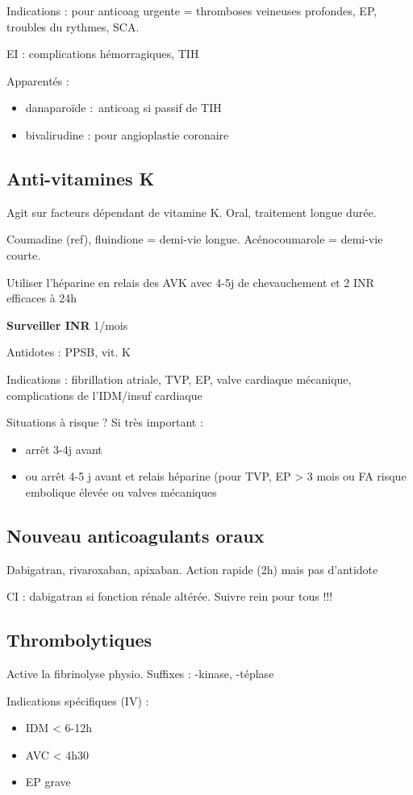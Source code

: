 \documentclass{article}
\begin{document}
Indications : pour anticoag urgente = thromboses veineuses profondes, EP,
troubles du rythmes, SCA.

EI : complications hémorragiques, TIH

Apparentés :
\begin{itemize}
  \item danaparoïde : anticoag si passif de TIH
  \item bivalirudine : pour angioplastie coronaire
\end{itemize}

\subsection{Anti-vitamines K}
Agit sur facteurs dépendant de vitamine K. Oral, traitement longue durée.

Coumadine (ref), fluindione = demi-vie longue. Acénocoumarole = demi-vie courte.

Utiliser l'héparine en relais des AVK avec 4-5j de chevauchement et 2 INR
efficaces à 24h

\textbf{Surveiller INR}  1/mois \danger

Antidotes : PPSB, vit. K

Indications : fibrillation atriale, TVP, EP, valve cardiaque mécanique,
complications de l'IDM/insuf cardiaque

Situations à risque ? Si très important :
\begin{itemize}
  \item arrêt 3-4j avant
  \item ou arrêt 4-5 j avant et relais héparine (pour TVP, EP > 3 mois ou FA
    risque embolique élevée ou valves mécaniques
\end{itemize}

\subsection{Nouveau anticoagulants oraux}
Dabigatran, rivaroxaban, apixaban. Action rapide (2h) mais pas d'antidote

CI : dabigatran si fonction rénale altérée. Suivre rein pour tous !!!

\subsection{Thrombolytiques}
Active la fibrinolyse physio. Suffixes : -kinase, -téplase

Indications spécifiques (IV) : 
\begin{itemize}
  \item IDM < 6-12h
  \item AVC < 4h30
  \item EP grave
\end{itemize}
\end{document}
